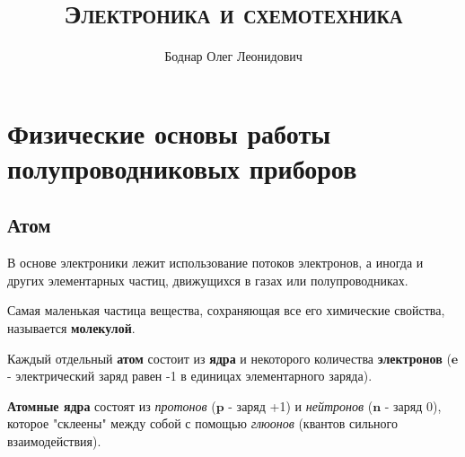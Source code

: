 

\setmainfont{Times New Roman}

\title{\textbf{\textsc{Электроника и схемотехника}}}
\author{Боднар Олег Леонидович}
\date{} %
\linespread{1.3} %

\hypersetup{hidelinks} %

\pagestyle{fancy} %
\fancyhf{}
\rhead{\thepage} %
\renewcommand{\headrulewidth}{1pt} %


	
	\maketitle %
	\thispagestyle{empty} %
	\clearpage %
	\setcounter{page}{1} %
	\thispagestyle{empty}
	\tableofcontents\label{sec:toc}
	\clearpage

	\section{Физические основы работы полупроводниковых приборов}
	
	\subsection{Атом}
	
	В основе электроники лежит использование потоков электронов, а иногда и других элементарных частиц, движущихся в газах или полупроводниках.
	
	\par Самая маленькая частица вещества, сохраняющая все его химические свойства, называется \textbf{молекулой}. 
	
	\par Каждый отдельный \textbf{атом} состоит из \textbf{ядра} и некоторого количества \textbf{электронов} ($\boldsymbol{e}$ - электрический заряд равен -1 в единицах элементарного заряда).
	
	\par \textbf{Атомные ядра} состоят из \textit{протонов} ($\boldsymbol{p}$ - заряд +1) и \textit{нейтронов} ($\boldsymbol{n}$ - заряд 0), которое "склеены" между собой с помощью \textit{глюонов} (квантов сильного взаимодействия).
	
